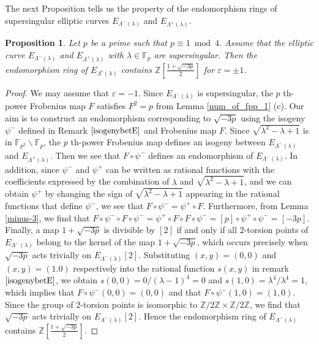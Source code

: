 \documentclass[a4paper, 11pt]{article}
\theoremstyle{plain}
\newtheorem{prop}[defn]{Proposition}
\newcommand{\?}{\textcolor{red}{??}}
\newcommand{\lm}{\lambda}
\newcommand{\Lm}{\Lambda}
\newcommand{\fp}{\mathbb{F}_p}
\newcommand{\fpp}{\mathbb{F}_{p^2}}
\newcommand{\bZ}{\mathbb{Z}}
\begin{document}
The next Proposition tells us the property of the endomorphism rings of supersingular elliptic curves $E_{\Lm^{-}(\lm)}$ and $E_{\Lm^{+}(\lm)}$.
\begin{prop}
\label{end1}
    Let $p$ be a prime such that $p \equiv 1 \bmod 4.$ Assume that the elliptic curve $ E_{\Lambda^{-}(\lm)}$ and $ E_{{\Lambda^{+}(\lm)}}$ with $\lm \in \fp$ are supersingular. Then the endomorphism ring of $ E_{\Lambda^{\varepsilon}(\lm)}$ contains $\bZ \left[ \frac{1+\sqrt{-3p}}{2}\right]$ for $\varepsilon=\pm1$.

\end{prop}

\begin{proof}
    We may assume that $\varepsilon=-1$. Since $ E_{\Lambda^{-}(\lm)}$ is supersingular, the $p$ th-power Frobenius map $F$ satisfies $F^2=p$ from Lemma \ref{num_of_fpp_1} (c).  Our aim is to construct an endomorphism corresponding to $\sqrt{-3p}$ using the isogeny $\psi^-$ defined in Remark $\ref{isogenybetE}$ and Frobenius map $F$.  Since $\sqrt{{\lm}^2-\lm+1}$ is in $\fpp \smallsetminus \fp$, the $p$ th-power Frobenius map defines an isogeny between $ E_{\Lambda^{-}(\lm)}$ and  $E_{{\Lambda^{+}(\lm)}}$. Then we see that $ F \circ \psi^-$ defines an endomorphism of $ E_{\Lambda^{-}(\lm)}$. In addition, since $\psi^-$ and ${\psi}^+$ can be written as rational functions with the coefficients expressed by the combination of $\lm$ and $\sqrt{{\lm}^2-\lm+1}$, and we can obtain ${\psi}^{+}$ by changing the sign of $\sqrt{{\lm}^2-\lm+1}$ appearing in the rational functions that define $\psi^-$, we see that $F \circ \psi^- = {\psi}^+ \circ F$. Furthermore, from Lemma \ref{minus-3}, we find that $F \circ \psi^- \circ F \circ \psi^-= {\psi}^+ \circ F\circ F \circ \psi^- =[p]\circ{\psi}^+  \circ \psi^- =[-3p].$ 
    Finally, a map ${1+\sqrt{-3p}}$ is divisible by $[2]$ if and only if all $2$-torsion points of $E_{\Lm^{-}(\lm)}$ belong to the kernel of the map $1+\sqrt{-3p}$, which occurs precisely when $\sqrt{-3p}$ acts trivially on $ E_{\Lambda^{-}(\lm)}[2]$. Substituting $(x,y)=(0,0)$ and $(x,y)=(1.0)$ respectively into the rational function $s(x,y)$ in remark $\ref{isogenybetE}$, we obtain $s(0,0)=0/(\lm-1)^4=0$ and $s(1,0)={\lm}^4/{\lm}^4=1$, which implies that $F \circ \psi^-(0,0)=(0,0)$ and that $F \circ \psi^-(1,0)=(1,0)$. Since the group of $2$-torsion points is isomorphic to $\bZ/2\bZ \times \bZ/2\bZ$, we find that $\sqrt{-3p}$ acts trivially on $ E_{\Lambda^{-}(\lm)}[2]$. Hence the endomorphism ring of $ E_{\Lambda^{-}(\lm)}$ contains $\bZ \left[ \frac{1+\sqrt{-3p}}{2}\right]$.

\end{proof}
\end{document}
